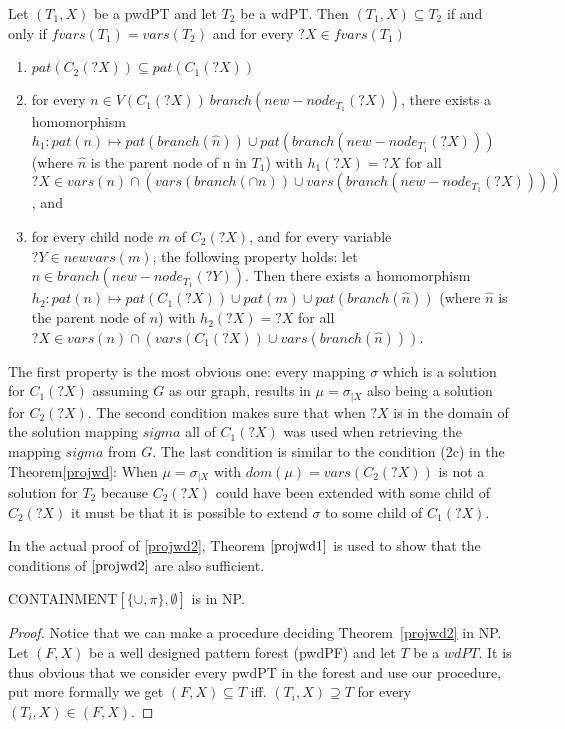 \begin{theorem}\label{projwd2}
	Let $(T_1,X)$ be a pwdPT and let $T_2$ be a wdPT. Then $(T_1,X) \subseteq
	T_2$ if and only if $fvars(T_1) = vars(T_2)$ and for every $?X \in
	fvars(T_1)$
	\begin{enumerate}
		\item $pat(C_2(?X)) \subseteq pat(C_1(?X))$
		\item for every $n \in V(C_1(?X)) \ branch (new-node_{T_1}(?X))$, there
			exists a homomorphism $h_1: pat(n) \mapsto pat(branch(\hat{n})) \cup
			pat(branch(new-node_{T_1}(?X)))$ (where $\hat{n}$ is the parent node
			of n in $T_1$) with $h_1(?X) = ?X$ for all $?X \in vars(n) \cap
			(vars(branch(\cap{n})) \cup vars(branch(new-node_{T_1}(?X))))$, and
		\item for every child node $m$ of $C_2(?X)$, and for every variable $?Y
			\in newvars(m)$, the following property holds: let $n \in
			branch(new-node_{T_1}(?Y))$. Then there exists a homomorphism
			$h_2:pat(n) \mapsto pat(C_1(?X)) \cup pat(m) \cup
			pat(branch(\hat{n}))$ (where $\hat{n}$ is the parent node of $n$)
			with $h_2(?X) = ?X$ for all $?X \in vars(n) \cap (vars(C_1(?X)) \cup
			vars(branch(\hat{n})))$.
	\end{enumerate}
\end{theorem}
\begin{proofidea}
	The first property is the most obvious one: every mapping $\sigma$ which is
	a solution for $C_1(?X)$ assuming $G$ as our graph, results in $\mu =
	\sigma_{|X}$ also being a solution for $C_2(?X)$.
	The second condition makes sure that when $?X$ is in the domain of the
	solution mapping $sigma$ all of $C_1(?X)$ was used when retrieving the
	mapping $sigma$ from $G$.
	The last condition is similar to the condition (2c) in the
	Theorem\ref{projwd}: When $\mu = \sigma_{|X}$ with $dom(\mu) =
	vars(C_2(?X))$ is not a solution for $T_2$ because $C_2(?X)$ could have been
	extended with some child of $C_2(?X)$ it must be that it is possible to
	extend $\sigma$ to some child of $C_1(?X)$.
\end{proofidea}

In the actual proof of \ref{projwd2}, Theorem $\ref{projwd1}$ is used to show
that the conditions of $\ref{projwd2}$ are also sufficient.

\begin{theorem}\label{ccuppiempty}
	CONTAINMENT$[\{\cup,\pi\},\emptyset]$ is in NP.
\end{theorem}
\begin{proof}
	Notice that we can make a procedure deciding Theorem~\ref{projwd2} in NP.
	Let $(F,X)$ be a well designed pattern forest (pwdPF) and let $T$ be a
	$wdPT$. It is thus obvious that we consider every pwdPT in the forest and
	use our procedure, put more formally we get $(F,X) \subseteq T$ iff.
	$(T_i,X) \supseteq T$ for every $(T_i,X) \in (F,X)$.
\end{proof}

